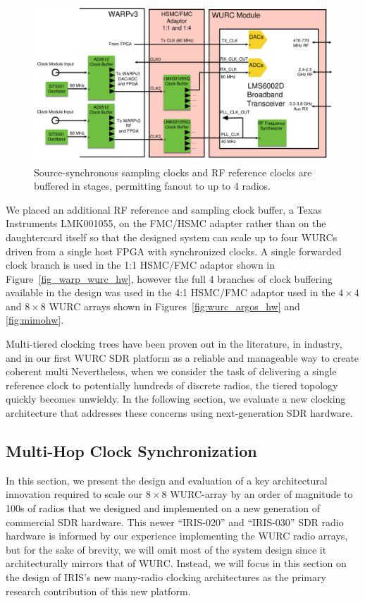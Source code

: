 \begin{figure}[h]
\centering
  \includegraphics[width=4.5in]{figs/clk/wurc_clock_diagram_2}   
    \caption{Source-synchronous sampling clocks and RF reference clocks are buffered in stages, permitting fanout to up to 4 radios.}
\label{fig:wurc_clock_diagram}
\end{figure}

We placed an additional RF reference and sampling clock buffer, a Texas Instruments LMK001055, on the FMC/HSMC adapter rather than on the daughtercard itself so that the designed system can scale up to four \ac{WURC}s driven from a single host FPGA with synchronized clocks.
A single forwarded clock branch is used in the 1:1 HSMC/FMC adaptor shown in Figure~\ref{fig_warp_wurc_hw}, however the full 4 branches of clock buffering available in the design was used in the 4:1 HSMC/FMC adaptor used in the $4\times 4$ and $8\times 8$ \ac{WURC} arrays shown in Figures~\ref{fig:wurc_argos_hw} and \ref{fig:mimohw}.

Multi-tiered clocking trees have been proven out in the literature, in industry, and in our first \ac{WURC} \ac{SDR} platform as a reliable and manageable way to create coherent multi
Nevertheless, when we consider the task of delivering a single reference clock to potentially hundreds of discrete radios, the tiered topology quickly becomes unwieldy.
In the following section, we evaluate a new clocking architecture that addresses these concerns using next-generation \ac{SDR} hardware. 



\subsection{Multi-Hop Clock Synchronization}
\label{sec_daisy_chain_clocking}
	
In this section, we present the design and evaluation of a key architectural innovation required to scale our $8\times 8$ \ac{WURC}-array by an order of magnitude to 100s of radios that we designed and implemented on a new generation of commercial \ac{SDR} hardware.
	This newer ``IRIS-020'' and ``IRIS-030'' \ac{SDR} radio hardware is informed by our experience implementing the \ac{WURC} radio arrays, but for the sake of brevity, we will omit most of the system design since it architecturally mirrors that of \ac{WURC}.
	Instead, we will focus in this section on the design of IRIS's new many-radio clocking architectures as the primary research contribution of this new platform.

